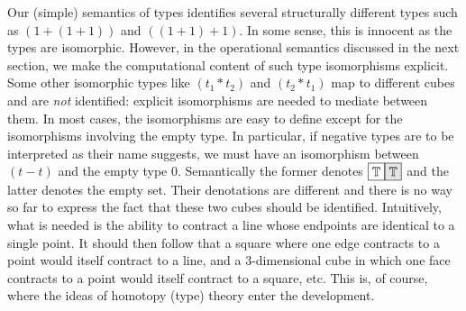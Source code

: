 \documentclass[authoryear,preprint]{sigplanconf}
\newcommand{\cubt}{\mathbb{T}}
\newcommand{\nodet}[2]{\fcolorbox{black}{white}{$#1$}\fcolorbox{black}{gray!20}{$#2$}}
\begin{document}
Our (simple) semantics of types identifies several structurally different
types such as $(1+(1+1))$ and $((1+1)+1)$. In some sense, this is innocent as
the types are isomorphic. However, in the operational semantics discussed in
the next section, we make the computational content of such type isomorphisms
explicit. Some other isomorphic types like $(t_1*t_2)$ and $(t_2*t_1)$ map to
different cubes and are \emph{not} identified: explicit isomorphisms are
needed to mediate between them. In most cases, the isomorphisms are easy to
define except for the isomorphisms involving the empty type. In particular,
if negative types are to be interpreted as their name suggests, we must have
an isomorphism between $(t-t)$ and the empty type 0. Semantically the former
denotes $\nodet{\cubt}{\cubt}$ and the latter denotes the empty set. Their
denotations are different and there is no way so far to express the fact that
these two cubes should be identified. Intuitively, what is needed is the
ability to contract a line whose endpoints are identical to a single
point. It should then follow that a square where one edge contracts to a
point would itself contract to a line, and a 3-dimensional cube in which one
face contracts to a point would itself contract to a square, etc. This is, of
course, where the ideas of homotopy (type) theory enter the development.
\end{document}

